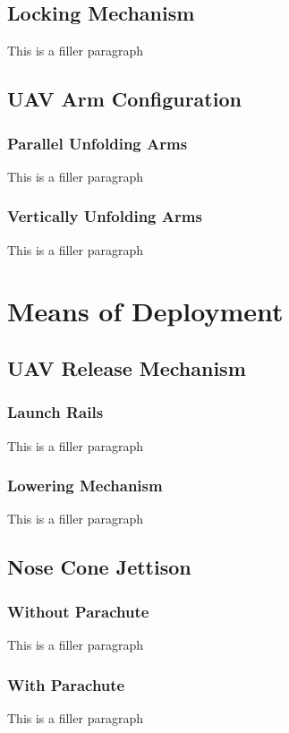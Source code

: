 	\subsection{Locking Mechanism}
		This is a filler paragraph
		
	\subsection{UAV Arm Configuration}
		\subsubsection{Parallel Unfolding Arms}
			This is a filler paragraph

		\subsubsection{Vertically Unfolding Arms}
			This is a filler paragraph

\section{Means of Deployment}\label{PL:Deployment:Deployment}
	\subsection{UAV Release Mechanism}
		\subsubsection{Launch Rails}
			This is a filler paragraph

		\subsubsection{Lowering Mechanism}
			This is a filler paragraph

	\subsection{Nose Cone Jettison}
		\subsubsection{Without Parachute}
			This is a filler paragraph
		
		\subsubsection{With Parachute}
			This is a filler paragraph

